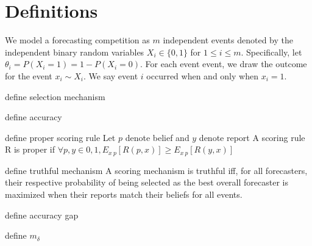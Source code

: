 \documentclass[letterpaper,12pt]{article}
\renewenvironment{abstract}
 {
  \begin{center}
  \vspace{3em} \bfseries \abstractname\vspace{0em}\vspace{0pt}
  \end{center}
  \list{}{%
    \setlength{\leftmargin}{20mm}%
    \setlength{\rightmargin}{\leftmargin}%
  }%
  \item\relax}
 {\endlist}
\newcommand{\1}{\mathbbm{1}}
\begin{document}


 


\section{Definitions}
We model a forecasting competition as $m$ independent events denoted by the independent binary random variables $X_i \in \{0, 1\}$ for $1 \leq i \leq m$. Specifically, let $\theta_i = P(X_i = 1) = 1 - P(X_i = 0)$. For each event event, we draw the outcome for the event $x_i \sim X_i$. We say event $i$ occurred when and only when $x_i = 1$. 

define selection mechanism

define accuracy

define proper scoring rule
Let $p$ denote belief and $y$ denote report
A scoring rule R is proper if $\forall p,y \in {0,1}, E_{x~p}[R(p,x)] \ge E_{x~p}[R(y,x)]$

define truthful mechanism
A scoring mechanism is truthful iff, for all forecasters, their respective probability of being selected as the best overall forecaster is maximized when their reports match their beliefs for all events. 

define accuracy gap

define $m_\delta$
\end{document}
